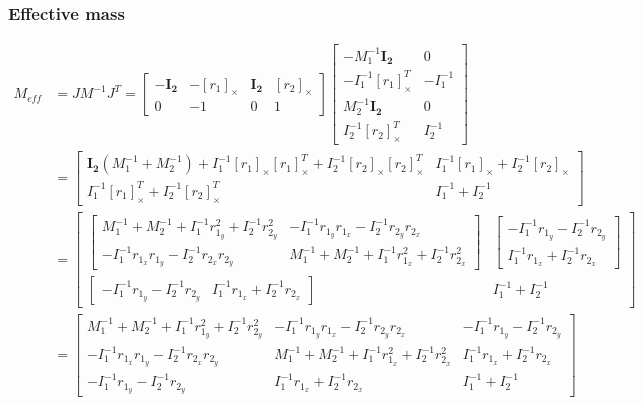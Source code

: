 \documentclass{article}
\begin{document}
	\subsubsection{Effective mass}
		\begin{align*}
			M_{eff}
				&=JM^{-1}J^T=
				\begin{bmatrix}
					-\boldsymbol{I_2} & -[r_1]_\times & \boldsymbol{I_2} & [r_2]_\times\\
					0 & -1 & 0 & 1
				\end{bmatrix}
				\begin{bmatrix}
					-M_1^{-1}\boldsymbol{I_2} & 0\\
					-I_1^{-1}[r_1]_\times^T & -I_1^{-1}\\
					M_2^{-1}\boldsymbol{I_2} & 0\\
					I_2^{-1}[r_2]_\times^T & I_2^{-1}
				\end{bmatrix}\\
				&=
				\begin{bmatrix}
					\boldsymbol{I_2}(M_1^{-1} + M_2^{-1}) + I_1^{-1}[r_1]_\times [r_1]_\times^T + I_2^{-1}[r_2]_\times [r_2]_\times^T 
						& I_1^{-1}[r_1]_\times + I_2^{-1}[r_2]_\times\\
					I_1^{-1}[r_1]_\times^T + I_2^{-1}[r_2]_\times^T & I_1^{-1} + I_2^{-1}
				\end{bmatrix}\\
				&=
				\begin{bmatrix}
					\begin{bmatrix}
						M_1^{-1} + M_2^{-1} + I_1^{-1}r_{1_y}^2 + I_2^{-1}r_{2_y}^2 & -I_1^{-1}r_{1_y}r_{1_x} - I_2^{-1}r_{2_y}r_{2_x}\\
						-I_1^{-1}r_{1_x}r_{1_y}-I_2^{-1}r_{2_x}r_{2_y} & M_1^{-1} + M_2^{-1} + I_1^{-1}r_{1_x}^2 +  I_2^{-1}r_{2_x}^2
					\end{bmatrix}	
					& 
					\begin{bmatrix}
						-I_1^{-1}r_{1_y}-I_2^{-1}r_{2_y}\\
						I_1^{-1}r_{1_x}+I_2^{-1}r_{2_x}
					\end{bmatrix}\\
					\begin{bmatrix}
						-I_1^{-1}r_{1_y}-I_2^{-1}r_{2_y}	&	I_1^{-1}r_{1_x}+I_2^{-1}r_{2_x}
					\end{bmatrix}
					 & I_1^{-1} + I_2^{-1}
				\end{bmatrix}\\		
				&=
				\begin{bmatrix}
						M_1^{-1} + M_2^{-1} + I_1^{-1}r_{1_y}^2 + I_2^{-1}r_{2_y}^2 & -I_1^{-1}r_{1_y}r_{1_x} - I_2^{-1}r_{2_y}r_{2_x} &-I_1^{-1}r_{1_y}-I_2^{-1}r_{2_y}\\
						-I_1^{-1}r_{1_x}r_{1_y}-I_2^{-1}r_{2_x}r_{2_y} & M_1^{-1} + M_2^{-1} + I_1^{-1}r_{1_x}^2 +  I_2^{-1}r_{2_x}^2 & I_1^{-1}r_{1_x}+I_2^{-1}r_{2_x} \\
						-I_1^{-1}r_{1_y}-I_2^{-1}r_{2_y} &I_1^{-1}r_{1_x}+I_2^{-1}r_{2_x} & I_1^{-1} + I_2^{-1}
				\end{bmatrix}	
		\end{align*}
\end{document}
